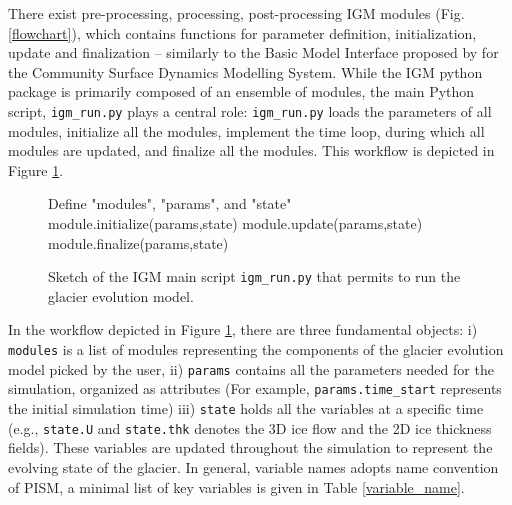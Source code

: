 \documentclass[10pt,twocolumn]{article}
\begin{document}
There exist pre-processing, processing, post-processing IGM modules (Fig. \ref{flowchart}),
which contains functions for parameter definition, initialization, update and finalization
-- similarly to the Basic Model Interface proposed by \citet{Tucker2022} for the 
Community Surface Dynamics Modelling System.
While the IGM python package is primarily composed of an ensemble of modules, the main Python script,
\texttt{igm\_run.py} plays a central role: \texttt{igm\_run.py} loads the parameters of all modules, 
initialize all the modules, implement the time loop, during which all modules are updated,
and finalize all the modules. This workflow is depicted in Figure \ref{code-main}. 


\begin{figure}
\begin{mdframed}
\begin{algorithmic}
\STATE Define "modules", "params", and "state"
\STATE
{}
\STATE module.initialize(params,state)
\ENDFOR
\STATE
{}
\STATE module.update(params,state)
\ENDFOR
\STATE
{}
\STATE module.finalize(params,state)
\ENDFOR
\end{algorithmic}
\end{mdframed}
\caption{Sketch of the IGM main script \texttt{igm\_run.py} that permits
to run the glacier evolution model. \label{code-main}}
\end{figure}

In the workflow depicted in Figure \ref{code-main}, there are three fundamental objects:
i) \texttt{modules} is a list of modules representing the components of 
the glacier evolution model picked by the user,
ii) \texttt{params} contains all the parameters needed for the simulation, organized as attributes
(For example, \texttt{params.time\_start} represents the initial simulation time)
iii) \texttt{state} holds all the variables at a specific time 
(e.g., \texttt{state.U} and \texttt{state.thk} denotes the 3D ice flow and the 2D ice thickness fields). 
These variables are updated throughout the simulation to represent the evolving state of the glacier.
In general, variable names adopts name convention of PISM, a minimal list of key variables is given in
Table \ref{variable_name}.
\end{document}
